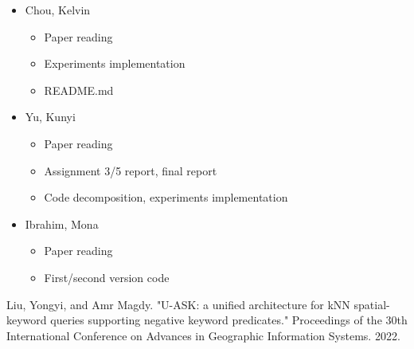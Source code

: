 \documentclass[]{IEEEphot}
\begin{document}
\begin{itemize}
\item Chou, Kelvin
\begin{itemize}
    \item Paper reading
    \item Experiments implementation
    \item README.md
\end{itemize}
\item Yu, Kunyi
\begin{itemize}
    \item Paper reading
    \item Assignment 3/5 report, final report
    \item Code decomposition, experiments implementation
\end{itemize}
\item Ibrahim, Mona
\begin{itemize}
    \item Paper reading
    \item First/second version code
\end{itemize}
\end {itemize}

\begin{thebibliography}{10}
     Liu, Yongyi, and Amr Magdy. "U-ASK: a unified architecture for kNN spatial-keyword queries supporting negative keyword predicates." Proceedings of the 30th International Conference on Advances in Geographic Information Systems. 2022.
\end{thebibliography}
\end{document}
